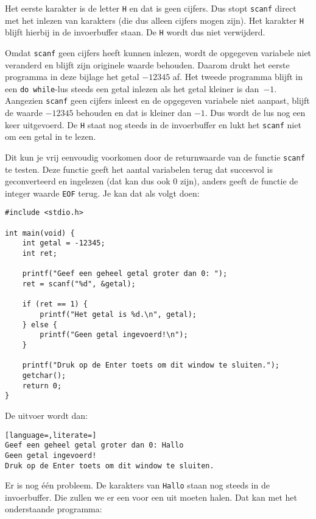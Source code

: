 \documentclass[a4paper,10pt,fleqn,twoside]{article}
\begin{document}
Het eerste karakter is de letter \lstinline|H| en dat is geen cijfers. Dus stopt \lstinline|scanf| direct met het inlezen van karakters (die dus alleen cijfers mogen zijn). Het karakter \lstinline|H| blijft hierbij in de invoerbuffer staan. De \lstinline|H| wordt dus niet verwijderd.

Omdat \lstinline|scanf| geen cijfers heeft kunnen inlezen, wordt de opgegeven variabele niet veranderd en blijft zijn originele waarde behouden. Daarom drukt het eerste programma in deze bijlage het getal $-12345$ af. Het tweede programma blijft in een \lstinline|do while|-lus steeds een getal inlezen als het getal kleiner is dan~$-1$. Aangezien \lstinline|scanf| geen cijfers inleest en de opgegeven variabele niet aanpast, blijft de waarde $-12345$ behouden en dat is kleiner dan $-1$. Dus wordt de lus nog een keer uitgevoerd. De \lstinline|H| staat nog steeds in de invoerbuffer en lukt het \lstinline|scanf| niet om een getal in te lezen.

Dit kun je vrij eenvoudig voorkomen door de returnwaarde van de functie \lstinline|scanf| te testen. Deze functie geeft het aantal variabelen terug dat succesvol is geconverteerd en ingelezen (dat kan dus ook 0 zijn), anders geeft de functie de integer waarde \lstinline|EOF| terug. Je kan dat als volgt doen:

\begin{lstlisting}
#include <stdio.h>

int main(void) {
    int getal = -12345;
    int ret;

    printf("Geef een geheel getal groter dan 0: ");
    ret = scanf("%d", &getal);

    if (ret == 1) {
        printf("Het getal is %d.\n", getal);
    } else {
        printf("Geen getal ingevoerd!\n");
    }

    printf("Druk op de Enter toets om dit window te sluiten.");
    getchar();
    return 0;
}
\end{lstlisting}

De uitvoer wordt dan:

\begin{lstlisting}[language=,literate=]
Geef een geheel getal groter dan 0: Hallo
Geen getal ingevoerd!
Druk op de Enter toets om dit window te sluiten.
\end{lstlisting}

Er is nog één probleem. De karakters van \lstinline|Hallo| staan nog steeds in de invoerbuffer. Die zullen we er een voor een uit moeten halen. Dat kan met het onderstaande programma:
\end{document}
